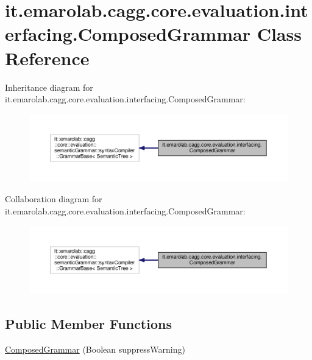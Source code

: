 \hypertarget{classit_1_1emarolab_1_1cagg_1_1core_1_1evaluation_1_1interfacing_1_1ComposedGrammar}{\section{it.\-emarolab.\-cagg.\-core.\-evaluation.\-interfacing.\-Composed\-Grammar Class Reference}
\label{classit_1_1emarolab_1_1cagg_1_1core_1_1evaluation_1_1interfacing_1_1ComposedGrammar}
}


Inheritance diagram for it.\-emarolab.\-cagg.\-core.\-evaluation.\-interfacing.\-Composed\-Grammar\-:\nopagebreak
\begin{figure}[H]
\begin{center}
\leavevmode
\includegraphics[width=350pt]{classit_1_1emarolab_1_1cagg_1_1core_1_1evaluation_1_1interfacing_1_1ComposedGrammar__inherit__graph}
\end{center}
\end{figure}


Collaboration diagram for it.\-emarolab.\-cagg.\-core.\-evaluation.\-interfacing.\-Composed\-Grammar\-:\nopagebreak
\begin{figure}[H]
\begin{center}
\leavevmode
\includegraphics[width=350pt]{classit_1_1emarolab_1_1cagg_1_1core_1_1evaluation_1_1interfacing_1_1ComposedGrammar__coll__graph}
\end{center}
\end{figure}
\subsection*{Public Member Functions}
\begin{DoxyCompactItemize}
\item 
\hyperlink{classit_1_1emarolab_1_1cagg_1_1core_1_1evaluation_1_1interfacing_1_1ComposedGrammar_a155acac4e3ea3126bab6e01ea8cce9bc}{Composed\-Grammar} (Boolean suppress\-Warning)
\end{DoxyCompactItemize}
